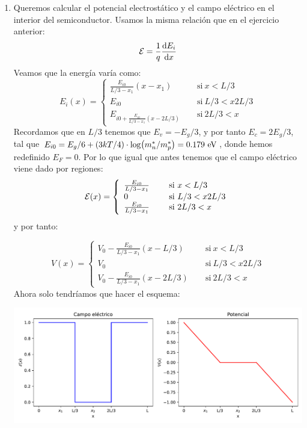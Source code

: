 \begin{enumerate}[label=\alph*)]
	\item Queremos calcular el potencial electrostático y el campo eléctrico en el interior del semiconductor. Usamos la misma relación que en el ejercicio anterior:
	\begin{equation}
		\mathcal{E} = \frac{1}{q} \frac{\mathrm{d} E_i}{\mathrm{d} x}
	\end{equation}
	Veamos que la energía varía como:
	\begin{equation}
		E_i(x) = \left\lbrace \begin{array}{ll}
			\frac{E_{i0}}{L/3-x_1} (x-x_1) \quad & \ \text{si} \ x<L/3 \\
			E_{i0} \quad & \ \text{si} \ L/3<x2L/3 \\
			E_{i0+\frac{E_{i0}}{L/3-x_1} (x-2L/3)} \quad & \ \text{si} \ 2L/3<x
		\end{array} \right.
	\end{equation}
	Recordamos que en $L/3$ tenemos que $E_v=-E_g/3$, y por tanto $E_c=2E_g/3$, tal que $E_{i0}=E_g/6+(3kT/4)\cdot \log(m_n^*/m_p^*)=0.179 \ \text{eV}$, donde hemos redefinido $E_F=0$. Por lo que igual que antes tenemos que el campo eléctrico viene dado por regiones:
	\begin{equation}
		\mathcal{E}(x) = \left\lbrace \begin{array}{ll}
			\frac{E_{i0}}{L/3-x_1} \quad & \ \text{si} \ x<L/3\\
			0 \quad & \ \text{si} \ L/3<x2L/3 \\
			\frac{E_{i0}}{L/3-x_1} \quad & \ \text{si} \ 2L/3<x
		\end{array} \right.
	\end{equation}
	y por tanto:

	\begin{equation}
		V(x) = \left\lbrace \begin{array}{ll}
			V_0 -\frac{E_{i0}}{L/3-x_1} (x-L/3) \quad & \ \text{si} \ x<L/3 \\
			V_0 \quad & \ \text{si} \ L/3<x2L/3 \\
			V_0 -\frac{E_{i0}}{L/3-x_1} (x-2L/3) \quad & \ \text{si} \ 2L/3<x
		\end{array} \right.
	\end{equation}
	Ahora solo tendríamos que hacer el esquema:

	\begin{center}
		\includegraphics[width=\linewidth]{Cuerpo/Ch_02/02_Ejercicio_16.pdf}
	\end{center}
		

\end{enumerate}
